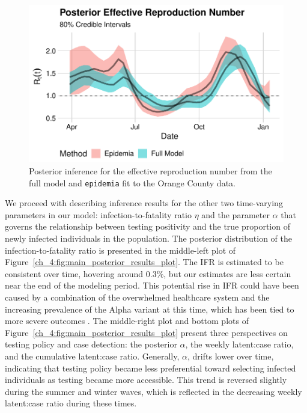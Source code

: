 \begin{figure}[htbp]
    \centering
    \includegraphics[width=1.0\columnwidth]{rt_comparison_oc_data_plot}
    \caption{Posterior inference for the effective reproduction number from the full model and \texttt{epidemia} fit to the Orange County data.}
    \label{ch_4:fig:rt_comparison_oc_data_plot}
\end{figure}
\par
We proceed with describing inference results for the other two time-varying parameters in our model: infection-to-fatality ratio \( \eta \)
and the parameter $\alpha$ that governs the relationship between testing positivity and the true proportion of newly infected individuals in the population.
The posterior distribution of the infection-to-fatality ratio is presented in the middle-left plot of Figure~\ref{ch_4:fig:main_posterior_results_plot}.
The IFR is estimated to be consistent over time, hovering around 0.3\%, but our estimates are less certain near the end of the modeling period.
This potential rise in IFR could have been caused by a combination of the overwhelmed healthcare system and the increasing prevalence of the Alpha variant at this time, which has been tied to more severe outcomes \citep{grint2021severity}.
The middle-right plot and bottom plots of Figure~\ref{ch_4:fig:main_posterior_results_plot} present three perspectives on testing policy and case detection: the posterior \( \alpha \), the weekly latent:case ratio, and the cumulative latent:case ratio.
Generally, \( \alpha \), drifts lower over time, indicating that testing policy became less preferential toward selecting infected individuals as testing became more accessible.
This trend is reversed slightly during the summer and winter waves, which is reflected in the decreasing weekly latent:case ratio during these times.
